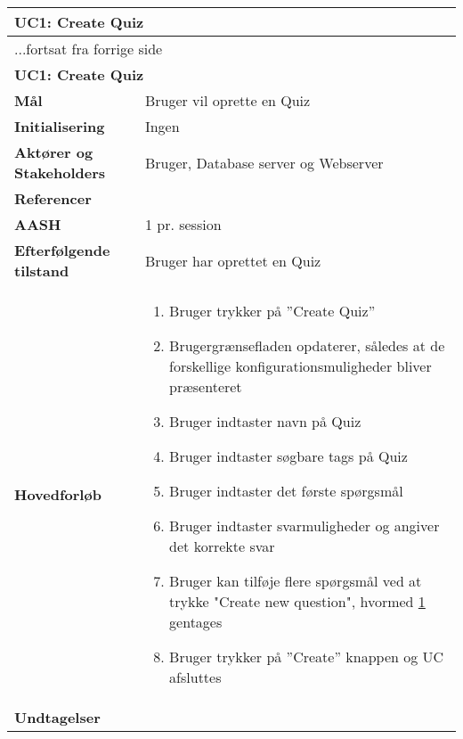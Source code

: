 \begin{center} \centering \label{ucCreateQuiz}
	\begin{longtable}{|p{4.6cm}|p{9.4cm}|}  %
	\hline
		\multicolumn{2}{|l|}{\textbf{UC1: Create Quiz}} \\\hline
		\endfirsthead
		
		\multicolumn{2}{l}{...fortsat fra forrige side} \\ \hline %
		\multicolumn{2}{|l|}{\textbf{UC1: Create Quiz}} \\\hline
		\endhead	
		
		\textbf{Mål}						&Bruger vil oprette en Quiz
		\\\hline
		\textbf{Initialisering}			&Ingen
		\\\hline
		\textbf{Aktører og Stakeholders}	&Bruger, Database server og Webserver
		\\\hline 
		\textbf{Referencer}				&%
		\\\hline
		\textbf{AASH}					&1 pr. session
		\\\hline
		\textbf{Efterfølgende tilstand}	&Bruger har oprettet en Quiz
		\\\hline
		\textbf{Hovedforløb}					
			&\begin{enumerate}
				\item Bruger trykker på ''Create Quiz''
				\item Brugergrænsefladen opdaterer, således at de forskellige konfigurationsmuligheder bliver præsenteret
				\item Bruger indtaster navn på Quiz
				\item Bruger indtaster søgbare tags på Quiz
				\item \label{ucPunktLabelSpm} Bruger indtaster det første spørgsmål
				\item Bruger indtaster svarmuligheder og angiver det korrekte svar
				\item Bruger kan tilføje flere spørgsmål ved at trykke "Create new question", hvormed \ref{ucPunktLabelSpm} gentages
				\item Bruger trykker på ''Create'' knappen og UC afsluttes
				
			\end{enumerate}\\\hline
		\textbf{Undtagelser}
			&			
			\\\hline
	\end{longtable} 
\end{center}